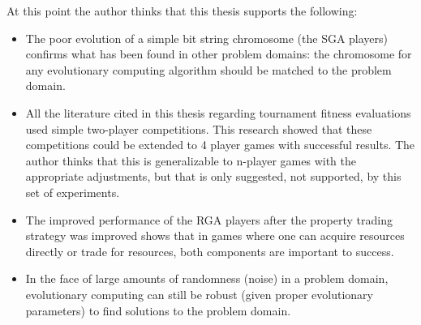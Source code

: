 At this point the author thinks that this thesis supports the following:
\begin{itemize} 
  \item {The poor evolution of a simple bit string chromosome (the SGA players) 
  confirms what has been found in other problem domains: the chromosome for any
  evolutionary computing algorithm should be matched to the problem domain.} 
  \item {All the literature cited in this thesis regarding tournament fitness 
  evaluations used simple two-player competitions. This research showed that 
  these competitions could be extended to 4 player games with successful 
  results. The author thinks that this is generalizable to n-player games with
  the appropriate adjustments, but that is only suggested, not supported, by 
  this set of experiments.}
  \item {The improved performance of the RGA players after the property trading 
  strategy was improved shows that in games where one can acquire resources
  directly or trade for resources, both components are important to success.}
  \item {In the face of large amounts of randomness (noise) in a problem domain,
  evolutionary computing can still be robust (given proper evolutionary 
  parameters) to find solutions to the problem domain.}
\end{itemize}